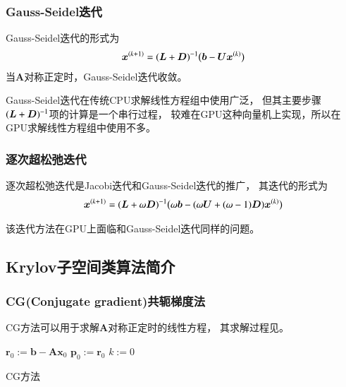 \subsubsection{Gauss-Seidel迭代}
Gauss-Seidel迭代的形式为
\begin{align}
  \bm{x}^{(k+1)}=\pb{\bm{L}+\bm{D}}^{-1}\pb[b]{\bm{b}-\bm{U}\bm{x}^{(k)}}
\end{align}
当$\bm{A}$对称正定时，Gauss-Seidel迭代收敛。\cite{golub2012matrix}

Gauss-Seidel迭代在传统CPU求解线性方程组中使用广泛，
但其主要步骤$\pb{\bm{L}+\bm{D}}^{-1}$项的计算是一个串行过程，
较难在GPU这种向量机上实现，所以在GPU求解线性方程组中使用不多。

\subsubsection{逐次超松弛迭代}
逐次超松弛迭代是Jacobi迭代和Gauss-Seidel迭代的推广，
其迭代的形式为\cite{golub2012matrix}
\begin{align}
  \bm{x}^{(k+1)}=\pb{\bm{L}+\omega\bm{D}}^{-1}
                  \pb[b]{\omega\bm{b}-\pb{\omega\bm{U}+(\omega-1)\bm{D}}\bm{x}^{(k)}}
\end{align}

该迭代方法在GPU上面临和Gauss-Seidel迭代同样的问题。

\subsection{Krylov子空间类算法简介}
\subsubsection{CG(Conjugate gradient)共轭梯度法}
CG方法可以用于求解$\bm{A}$对称正定时的线性方程，
其求解过程见。\cite{golub2012matrix}

\begin{algorithm}
$\bm{r}_0 := \bm{b}-\bm{A}\bm{x}_0$ \;
$\bm{p}_0 := \bm{r}_0$\;
$k:=0$\;

\caption{CG方法\label{alg:gpu.cg}}
\end{algorithm}

